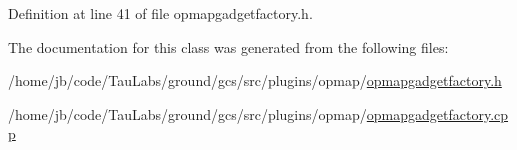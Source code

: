 \-Definition at line 41 of file opmapgadgetfactory.\-h.



\-The documentation for this class was generated from the following files\-:\begin{DoxyCompactItemize}
\item 
/home/jb/code/\-Tau\-Labs/ground/gcs/src/plugins/opmap/\hyperlink{opmapgadgetfactory_8h}{opmapgadgetfactory.\-h}\item 
/home/jb/code/\-Tau\-Labs/ground/gcs/src/plugins/opmap/\hyperlink{opmapgadgetfactory_8cpp}{opmapgadgetfactory.\-cpp}\end{DoxyCompactItemize}

